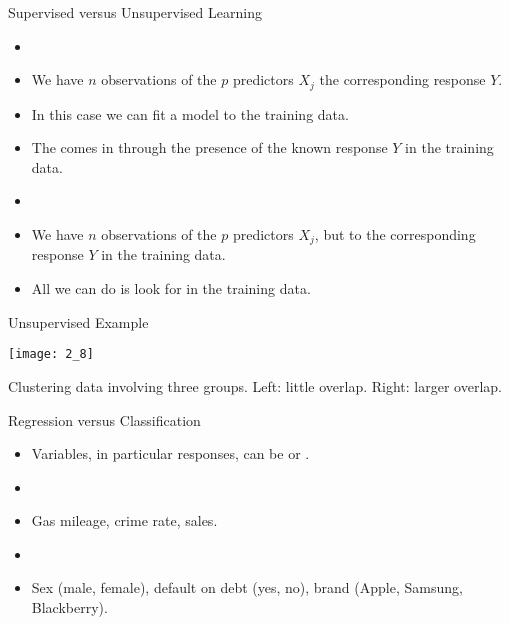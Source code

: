 \documentclass[mathserif, aspectratio=169]{beamer}
\begin{document}
\begin{frame}{Supervised versus Unsupervised Learning}
	\begin{cpage}
		\begin{itemize}
			\item[] 
			\item We have $n$ observations of the $p$ predictors $X_j$ 
				the corresponding response $Y$.
			\item In this case we can fit a model to the training data.
			\item The  comes in through the presence of the known
				response $Y$ in the training data.
			\item[] 
			\item We have $n$ observations of the $p$ predictors $X_j$,
				but  to the corresponding response $Y$ in the training data.
			\item All we can do is look for  in the training data.
		\end{itemize}
	\end{cpage}
\end{frame}

\begin{frame}{Unsupervised Example}
	\vspace{-5mm}
	\begin{center}
		\texttt{[image: 2\_8]}

		Clustering data involving three groups. Left: little overlap. Right: larger overlap.
	\end{center}
\end{frame}

\begin{frame}{Regression versus Classification}
	\begin{itemize}
		\item Variables, in particular responses, can be  or
			.
		\item[] 
		\item Gas mileage, crime rate, sales. 
		\item[] 
		\item Sex (male, female), default on debt (yes, no), brand (Apple, Samsung, Blackberry).
	\end{itemize}
\end{frame}
\end{document}
